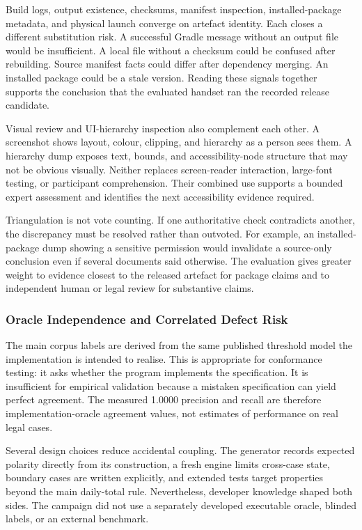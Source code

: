 Build logs, output existence, checksums, manifest inspection, installed-package metadata, and physical launch converge on artefact identity. Each closes a different substitution risk. A successful Gradle message without an output file would be insufficient. A local file without a checksum could be confused after rebuilding. Source manifest facts could differ after dependency merging. An installed package could be a stale version. Reading these signals together supports the conclusion that the evaluated handset ran the recorded release candidate.

Visual review and UI-hierarchy inspection also complement each other. A screenshot shows layout, colour, clipping, and hierarchy as a person sees them. A hierarchy dump exposes text, bounds, and accessibility-node structure that may not be obvious visually. Neither replaces screen-reader interaction, large-font testing, or participant comprehension. Their combined use supports a bounded expert assessment and identifies the next accessibility evidence required.

Triangulation is not vote counting. If one authoritative check contradicts another, the discrepancy must be resolved rather than outvoted. For example, an installed-package dump showing a sensitive permission would invalidate a source-only conclusion even if several documents said otherwise. The evaluation gives greater weight to evidence closest to the released artefact for package claims and to independent human or legal review for substantive claims.

\subsubsection{Oracle Independence and Correlated Defect Risk}

The main corpus labels are derived from the same published threshold model the implementation is intended to realise. This is appropriate for conformance testing: it asks whether the program implements the specification. It is insufficient for empirical validation because a mistaken specification can yield perfect agreement. The measured 1.0000 precision and recall are therefore implementation-oracle agreement values, not estimates of performance on real legal cases.

Several design choices reduce accidental coupling. The generator records expected polarity directly from its construction, a fresh engine limits cross-case state, boundary cases are written explicitly, and extended tests target properties beyond the main daily-total rule. Nevertheless, developer knowledge shaped both sides. The campaign did not use a separately developed executable oracle, blinded labels, or an external benchmark.

